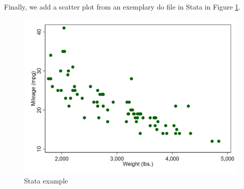 \documentclass[12pt]{article}
\theoremstyle{definition}
\begin{document}
Finally, we add a scatter plot from an exemplary do file in Stata in Figure \ref{fig:auto_scatter}.
\begin{figure}[tbh!]
\centering
\includegraphics[width=.6\linewidth]{application/scatter.png}
\caption[]{Stata example}
\label{fig:auto_scatter}
\end{figure}

\newpage 



%

\end{document}
